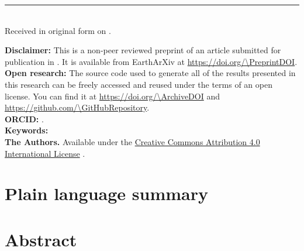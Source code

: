 \documentclass[onecolumn,10pt,A4]{article}
\begin{document}
\thispagestyle{plain}
\begin{FlushLeft}
  \begin{spacing}{2}
    {\LARGE\bfseries \Title}
  \end{spacing}
  {\color{lightgray}\hrule height 1.5pt}
  \vspace{0.3cm}
  \Authors
  \\[0.2cm]
  {\footnotesize \Affiliations}
  \newline
  {\footnotesize \Corresponding}
  \newline
  {\footnotesize
    Received in original form on \SubmittedOn.
  }
\end{FlushLeft}

\begin{summarybox}
  \noindent
  \textbf{Disclaimer:}
  This is a non-peer reviewed preprint of an article submitted for publication
  in \textit{\Journal{}}. It is available from EarthArXiv at
  \url{https://doi.org/\PreprintDOI}.
  \\[0.2cm]
  \noindent
  \textbf{Open research:}
  The source code used to generate all of the results presented in this
  research can be freely accessed and reused under the terms of an open license.
  You can find it at \url{https://doi.org/\ArchiveDOI} and
  \url{https://github.com/\GitHubRepository}.
  \\[0.2cm]
  \noindent
  \textbf{ORCID:} \AuthorORCIDs{}.
  \\[0.2cm]
  \noindent
  \textbf{Keywords:} \Keywords{}
  \\[0.2cm]
  \noindent
  \textbf{\textcopyright{} \Year{} The Authors.}
  Available under the \href{https://creativecommons.org/licenses/by/4.0/}{Creative Commons Attribution 4.0 International License}
  \faCreativeCommons\faCreativeCommonsBy{}.
\end{summarybox}

\section*{\normalsize Plain language summary}
\begingroup
   \small  \par
\endgroup

\section*{\normalsize Abstract}
\begingroup
   \small  \par
\endgroup





\end{document}
